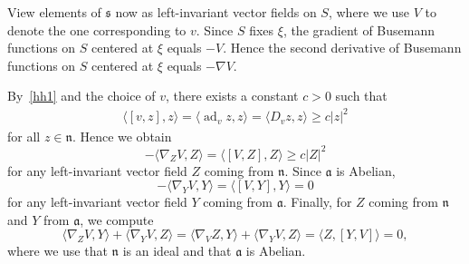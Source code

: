 \documentclass[10pt,a4paper]{amsart}
\numberwithin{equation}{section}
\DeclareMathOperator{\ad}{ad}
\begin{document}
View elements of $\mathfrak s$ now as left-invariant vector fields on $S$,
where we use $V$ to denote the one corresponding to $v$.
Since $S$ fixes $\xi$, the gradient of Busemann functions on $S$ centered at $\xi$ equals $-V$.
Hence the second derivative of Busemann functions on $S$ centered at $\xi$ equals $-\nabla V$.

By~\ref{hh1} and the choice of $v$, there exists a constant $c>0$ such that
\begin{align*}
	\langle [v,z],z\rangle = \langle\ad_vz,z\rangle = \langle D_vz,z\rangle \ge c|z|^2
\end{align*}
for all $z\in \mathfrak n$.
Hence we obtain
\[
	-\langle\nabla_ZV,Z\rangle = \langle[V,Z],Z\rangle \ge c|Z|^2
\]
for any left-invariant vector field $Z$ coming from $\mathfrak n$.
Since $\mathfrak a$ is Abelian,
\[
	-\langle\nabla_YV,Y\rangle = \langle[V,Y],Y\rangle = 0
\]
for any left-invariant vector field $Y$ coming from $\mathfrak a$.
Finally, for $Z$ coming from $\mathfrak n$ and $Y$ from $\mathfrak a$, we compute
\[
	\langle \nabla_ZV ,Y \rangle + \langle \nabla_YV ,Z \rangle
= \langle \nabla_VZ ,Y \rangle + \langle \nabla_YV ,Z \rangle = \langle Z , [Y,V] \rangle = 0,
\]
where we use that $\mathfrak n$ is an ideal and that $\mathfrak a$ is Abelian.
\end{document}
